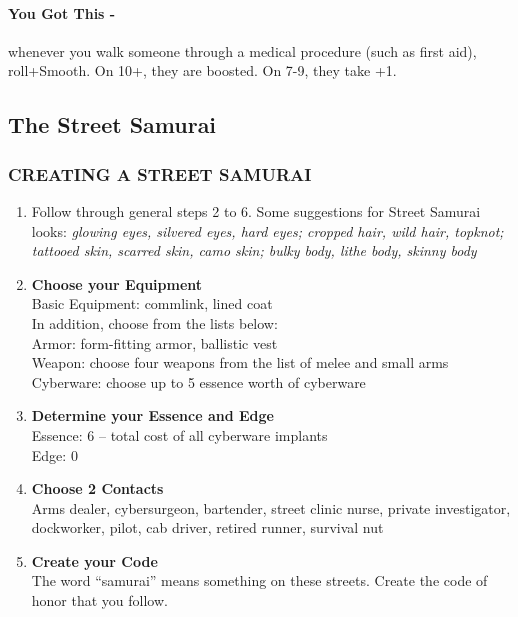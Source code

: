 \paragraph{You Got This -} whenever you walk someone through a medical procedure (such as first aid), roll+Smooth. On 10+, they are boosted. On 7-9, they take +1.



\clearpage
\subsection{The Street Samurai}

\subsubsection{CREATING A STREET SAMURAI}
\begin{enumerate}
    \item Follow through general steps 2 to 6. Some suggestions for Street Samurai looks: \textit{glowing eyes, silvered eyes, hard eyes; cropped hair, wild hair, topknot; tattooed skin, scarred skin, camo skin; bulky body, lithe body, skinny body}
    
    \item \textbf{Choose your Equipment} \\
    Basic Equipment: commlink, lined coat \\
    In addition, choose from the lists below: \\
    Armor: form-fitting armor, ballistic vest \\
    Weapon: choose four weapons from the list of melee and small arms \\
    Cyberware: choose up to 5 essence worth of cyberware
    
    \item \textbf{Determine your Essence and Edge} \\
    Essence: 6 – total cost of all cyberware implants \\
    Edge: 0
    
    \item \textbf{Choose 2 Contacts} \\
    Arms dealer, cybersurgeon, bartender, street clinic nurse, private investigator, dockworker, pilot, cab driver, retired runner, survival nut
    
    \item \textbf{Create your Code} \\
    The word “samurai” means something on these streets. Create the code of honor that you follow.
    

\end{enumerate}
